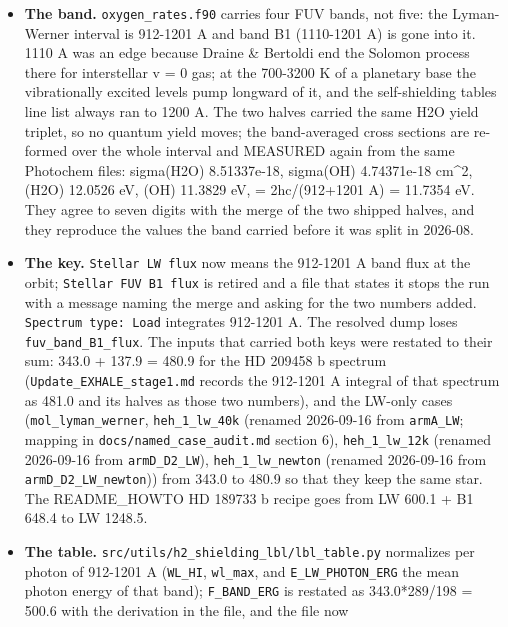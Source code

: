 \documentclass[english,a4paper]{my_memo}
\providecommand{\tightlist}{\setlength{\itemsep}{0pt}\setlength{\parskip}{0pt}}
\begin{document}
\begin{itemize}
  \begin{itemize}
  \tightlist
  \item
    \textbf{The band.} \texttt{oxygen\_rates.f90} carries four FUV bands, not five: the
    Lyman-Werner interval is 912-1201 A and band B1 (1110-1201 A) is gone
    into it. 1110 A was an edge because Draine \& Bertoldi end the Solomon
    process there for interstellar v = 0 gas; at the 700-3200 K of a
    planetary base the vibrationally excited levels pump longward of it, and
    the self-shielding table\textquotesingle s line list always ran to 1200 A. The two
    halves carried the same H2O yield triplet, so no quantum yield moves;
    the band-averaged cross sections are re-formed over the whole interval
    and MEASURED again from the same Photochem files: sigma(H2O)
    8.51337e-18, sigma(OH) 4.74371e-18 cm\^{}2, (H2O) 12.0526 eV, (OH)
    11.3829 eV, = 2hc/(912+1201 A) = 11.7354 eV. They agree to seven
    digits with the merge of the two shipped halves, and they reproduce the
    values the band carried before it was split in 2026-08.
  \item
    \textbf{The key.} \texttt{Stellar\ LW\ flux} now means the 912-1201 A band flux at the
    orbit; \texttt{Stellar\ FUV\ B1\ flux} is retired and a file that states it stops
    the run with a message naming the merge and asking for the two numbers
    added. \texttt{Spectrum\ type:\ Load} integrates 912-1201 A. The resolved dump
    loses \texttt{fuv\_band\_B1\_flux}. The inputs that carried both keys were
    restated to their sum: 343.0 + 137.9 = 480.9 for the HD 209458 b
    spectrum (\texttt{Update\_EXHALE\_stage1.md} records the 912-1201 A integral of
    that spectrum as 481.0 and its halves as those two numbers), and the
    LW-only cases (\texttt{mol\_lyman\_werner}, \texttt{heh\_1\_lw\_40k} (renamed 2026-09-16 from \texttt{armA\_LW}; mapping in \texttt{docs/named\_case\_audit.md} section 6), \texttt{heh\_1\_lw\_12k} (renamed 2026-09-16 from \texttt{armD\_D2\_LW}),
    \texttt{heh\_1\_lw\_newton} (renamed 2026-09-16 from \texttt{armD\_D2\_LW\_newton})) from 343.0 to 480.9 so that they keep the same
    star. The README\_HOWTO HD 189733 b recipe goes from LW 600.1 + B1 648.4
    to LW 1248.5.
  \item
    \textbf{The table.} \texttt{src/utils/h2\_shielding\_lbl/lbl\_table.py} normalizes per
    photon of 912-1201 A (\texttt{WL\_HI}, \texttt{wl\_max}, and \texttt{E\_LW\_PHOTON\_ERG} the mean
    photon energy of that band); \texttt{F\_BAND\_ERG} is restated as
    343.0*289/198 = 500.6 with the derivation in the file, and the file now

\end{itemize}
\end{itemize}
\end{document}
